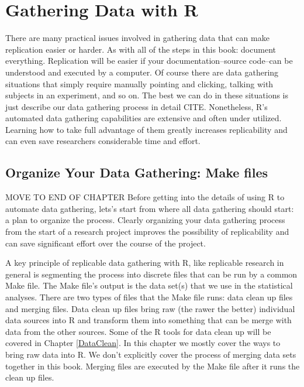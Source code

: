



\chapter{Gathering Data with R}\label{DataGather}

There are many practical issues involved in gathering data that can make replication easier or harder. As with all of the steps in this book: document everything. Replication will be easier if your documentation--source code--can be understood and executed by a computer. Of course there are data gathering situations that simply require manually pointing and clicking, talking with subjects in an experiment, and so on. The best we can do in these situations is just describe our data gathering process in detail CITE. Nonetheless, R's automated data gathering capabilities are extensive and often under utilized. Learning how to take full advantage of them greatly increases replicability and can even save researchers considerable time and effort.

\section{Organize Your Data Gathering: Make files}
MOVE TO END OF CHAPTER
Before getting into the details of using R to automate data gathering, lets's start from where all data gathering should start: a plan to organize the process. Clearly organizing your data gathering process from the start of a research project improves the possibility of replicability and can save significant effort over the course of the project. 

A key principle of replicable data gathering with R, like replicable research in general is segmenting the process into discrete files that can be run by a common Make file. The Make file's output is the data set(s) that we use in the statistical analyses. There are two types of files that the Make file runs: data clean up files and merging files. Data clean up files bring raw (the rawer the better) individual data sources into R and transform them into something that can be merge with data from the other sources. Some of the R tools for data clean up will be covered in Chapter \ref{DataClean}. In this chapter we mostly cover the ways to bring raw data into R. We don't explicitly cover the process of merging data sets together in this book. Merging files are executed by the Make file after it runs the clean up files.

